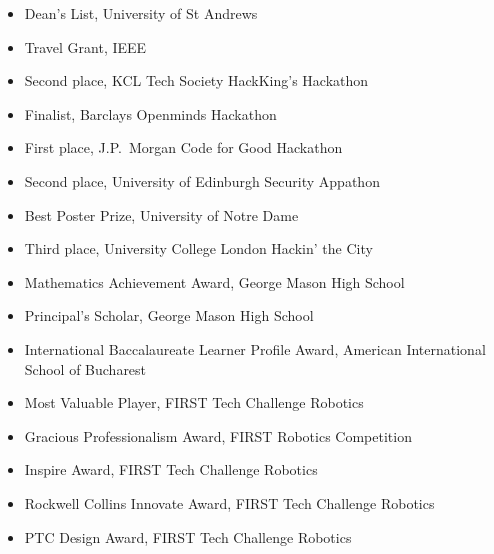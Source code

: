 \documentclass[line,margin]{cv}
\begin{document}
\begin{resume}
\begin{itemize}
    \item Dean's List, University of St Andrews
    \item Travel Grant, IEEE
    \item Second place, KCL Tech Society HackKing's Hackathon
    \item Finalist, Barclays Openminds Hackathon
    \item First place, J.P.\ Morgan Code for Good Hackathon
    \item Second place, University of Edinburgh Security Appathon
    \item Best Poster Prize, University of Notre Dame
    \item Third place, University College London Hackin' the City
    \item Mathematics Achievement Award, George Mason High School
    \item Principal's Scholar, George Mason High School
    \item International Baccalaureate Learner Profile Award, American International School of Bucharest
    \item Most Valuable Player, FIRST Tech Challenge Robotics
    \item Gracious Professionalism Award, FIRST Robotics Competition
    \item Inspire Award, FIRST Tech Challenge Robotics
    \item Rockwell Collins Innovate Award, FIRST Tech Challenge Robotics
    \item PTC Design Award, FIRST Tech Challenge Robotics

\end{itemize}

\end{resume}
\end{document}
